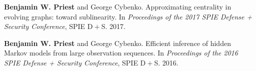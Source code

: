 \item \textbf{Benjamin W. Priest} and George Cybenko.
	Approximating centrality in evolving graphs: toward sublinearity.
	In \emph{Proceedings of the 2017 SPIE Defense + Security Conference}, 
	SPIE D$\! + \!$S.
	2017.

\item \textbf{Benjamin W. Priest} and George Cybenko.
	Efficient inference of hidden Markov models from large observation sequences.
	In \emph{Proceedings of the 2016 SPIE Defense + Security Conference}, 
	SPIE D$\! + \!$S.
	2016.
